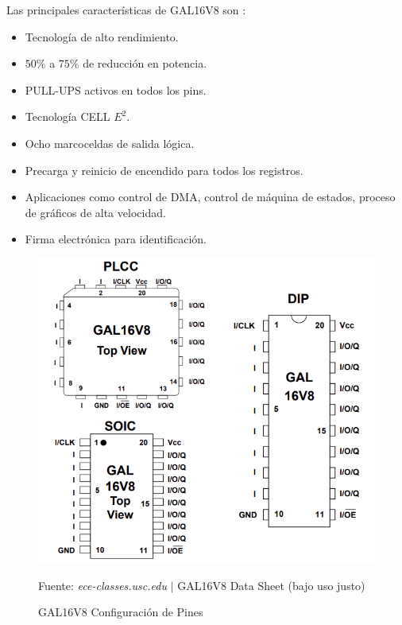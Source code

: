 \documentclass{article}
\begin{document}
    Las principales características de GAL16V8 son \cite{lattice-semiconductor-corp-2004}:

    \begin{itemize}
        \item Tecnología de alto rendimiento.
        \item $50\%$ a $75\%$ de reducción en potencia.
        \item PULL-UPS activos en todos los pins.
        \item Tecnología CELL $E^2$.
        \item Ocho marcoceldas de salida lógica.
        \item Precarga y reinicio de encendido para todos los registros.
        \item Aplicaciones como control de DMA, control de máquina de estados, proceso de gráficos de alta velocidad.
        \item Firma electrónica para identificación.
    \end{itemize}


    \begin{figure}[H]
        \centering
        \includegraphics[width=0.5\paperwidth]{images/datasheet-gal16v8-pins}
        \caption{GAL16V8 Configuración de Pines}\footnotesize
        Fuente: \textit{ece-classes.usc.edu} $\mid$ GAL16V8 Data Sheet \cite{lattice-semiconductor-corp-2004} (bajo uso justo)
    \end{figure}
\end{document}
